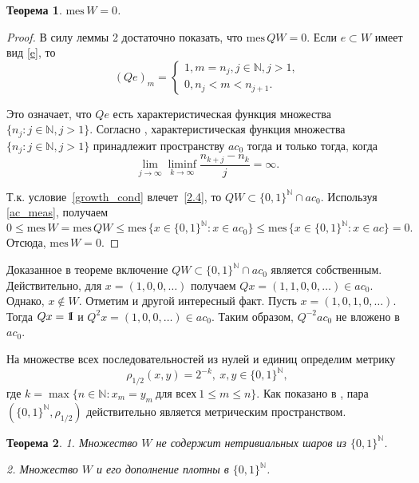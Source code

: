 \documentclass[12pt]{article}
\newcommand{\emm}{\mathrm{1\hspace{-0.3em} I}}
\newtheorem{thm}{Теорема}
\def\N{{\mathbb{N}}}
\def\mes{{\mathrm{mes}}}
\begin{document}
\begin{thm}
$\mes \, W=0$.
\end{thm}

\begin{proof}
В силу леммы 2 достаточно показать, что $\mes \, QW=0$. Если $e\subset W$ имеет вид \eqref{e}, то
$$(Qe)_m=\begin{cases}
1, m=n_j, j\in\N, j>1,\\
0, n_j<m<n_{j+1}.
\end{cases}$$

Это означает, что $Qe$ есть характеристическая функция множества $\{n_j: j\in \N, j>1\}$. Согласно \cite[Лемма 1]{Avdeev2019}, характеристическая функция множества $\{n_j: j\in \N, j>1\}$ принадлежит пространству $ac_0$ тогда и только тогда, когда
\begin{equation}\label{2.4}
    \lim\limits_{j\to\infty}\liminf_{k\to\infty}\frac{n_{k+j}-n_k}j=\infty.
\end{equation}

Т.к. условие~\eqref{growth_cond} влечет~\eqref{2.4}, то $QW \subset \{0,1\}^\N \cap ac_0$. Используя \eqref{ac_meas}, получаем
$$0\le \mes \, W= \mes \, QW\le \mes \, \{x\in \{0,1\}^\N: x\in ac_0\}\le \mes \, \{x\in \{0,1\}^\N: x\in ac\}=0.$$
Отсюда, $\mes \, W=0$.
\end{proof}

Доказанное в теореме включение $QW \subset \{0,1\}^\N \cap ac_0$ является собственным. Действительно, для $x=(1, 0, 0, \dots)$ получаем $Qx=(1,1, 0, 0, \dots)\in ac_0$. Однако, $x\notin W$. Отметим и другой интересный факт. Пусть $x=(1,0,1,0,\dots)$. Тогда $Qx=\emm$ и $Q^2x=(1,0,0, \dots)\in ac_0$. Таким образом, $Q^{-2}ac_0$ не вложено в $ac_0$.


На множестве всех последовательностей из нулей и единиц определим метрику
$$\rho_{1/2}(x,y)=2^{-k}, \ x,y\in\{0,1\}^\N,$$
где $k=\max\{n\in\N : x_m=y_m \ \text{для всех} \ 1\le m\le n\}.$ Как показано в \cite[Утверждение 2.1.8]{Edgar}, пара $(\{0,1\}^\N, \rho_{1/2})$ действительно является метрическим пространством.

\begin{thm}
1. Множество $W$ не содержит нетривиальных шаров из $\{0,1\}^\N$.

2. Множество $W$ и его дополнение плотны в $\{0,1\}^\N$.
\end{thm}
\end{document}
